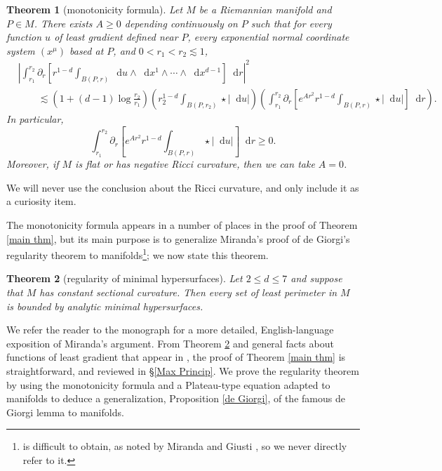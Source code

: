 \documentclass[reqno,10pt]{amsart}
\newcommand*\dif{\mathop{}\!\mathrm{d}}
\newtheorem{mainthm}{Theorem}
\theoremstyle{definition}
\numberwithin{equation}{section}
\begin{document}
\begin{mainthm}[monotonicity formula]\label{monotonicity prestate}
Let $M$ be a Riemannian manifold and $P \in M$. There exists $A \geq 0$ depending continuously on $P$ such that for every function $u$ of least gradient defined near $P$, every exponential normal coordinate system $(x^\mu)$ based at $P$, and $0 < r_1 < r_2 \lesssim 1$,
\begin{align*}
&\left|\int_{r_1}^{r_2} \partial_r \left[r^{1 - d} \int_{B(P, r)} \dif u \wedge \dif x^1 \wedge \cdots \wedge \dif x^{d - 1}\right] \dif r\right|^2 \\
&\qquad \lesssim \left(1 + (d - 1) \log \frac{r_2}{r_1}\right) \left(r_2^{1 - d}\int_{B(P, r_2)} \star |\dif u| \right)\left(\int_{r_1}^{r_2} \partial_r \left[e^{Ar^2} r^{1 - d} \int_{B(P, r)} \star |\dif u|\right] \dif r\right).
\end{align*}
In particular,
\begin{equation}\label{weak monotonicity}
\int_{r_1}^{r_2} \partial_r \left[e^{Ar^2} r^{1 - d} \int_{B(P, r)} \star |\dif u|\right] \dif r \geq 0.
\end{equation}
Moreover, if $M$ is flat or has negative Ricci curvature, then we can take $A = 0$.
\end{mainthm}

We will never use the conclusion about the Ricci curvature, and only include it as a curiosity item.

The monotonicity formula appears in a number of places in the proof of Theorem \ref{main thm}, but its main purpose is to generalize Miranda's proof \cite{Miranda66} of de Giorgi's regularity theorem \cite{deGiorgi61} to manifolds\footnote{\cite{deGiorgi61} is difficult to obtain, as noted by Miranda and Giusti \cite{Miranda66, Giusti77}, so we never directly refer to it.}; we now state this theorem.

\begin{mainthm}[regularity of minimal hypersurfaces]\label{main lma}
Let $2 \leq d \leq 7$ and suppose that $M$ has constant sectional curvature.
Then every set of least perimeter in $M$ is bounded by analytic minimal hypersurfaces.
\end{mainthm}

We refer the reader to the monograph \cite[Part 1]{Giusti77} for a more detailed, English-language exposition of Miranda's argument.
From Theorem \ref{main lma} and general facts about functions of least gradient that appear in \cite{Miranda67}, the proof of Theorem \ref{main thm} is straightforward, and reviewed in \S\ref{Max Princip}.
We prove the regularity theorem by using the monotonicity formula and a Plateau-type equation adapted to manifolds to deduce a generalization, Proposition \ref{de Giorgi}, of the famous de Giorgi lemma to manifolds.
\end{document}
